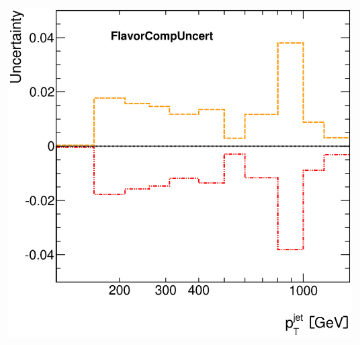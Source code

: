 \documentclass[12pt, twoside]{article}
\numberwithin{equation}{section}
\numberwithin{figure}{section}
\newenvironment{changemargin}[2]{%
\begin{list}{}{%
\setlength{\topsep}{0pt}%
\setlength{\leftmargin}{#1}%
\setlength{\rightmargin}{#2}%
\setlength{\listparindent}{\parindent}%
\setlength{\itemindent}{\parindent}%
\setlength{\parsep}{\parskip}%
}%
\item[]}{\end{list}}
\begin{document}
\begin{figure}[H]
\begin{changemargin}{-1.0cm}{-0.75cm}
\begin{changemargin}{-0.75cm}{-1.0cm}
\begin{subfigure}[b]{0.25\textwidth}
        \end{subfigure}
        \begin{subfigure}[b]{0.25\textwidth}
            \includegraphics[width=\textwidth]{./images/JetSystematics/JetSystematic-4.eps}
        \end{subfigure}


\end{changemargin}
\end{changemargin}
\end{figure}
\end{document}

